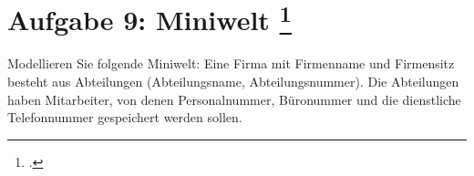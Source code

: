\documentclass{lehramt-informatik-aufgabe}
\begin{document}

\section{Aufgabe 9: Miniwelt
\footcite{db:ab:klausurvorbereitung}}

Modellieren Sie folgende Miniwelt: Eine Firma mit Firmenname und
Firmensitz besteht aus Abteilungen (Abteilungsname, Abteilungsnummer).
Die Abteilungen haben Mitarbeiter, von denen Personalnummer, Büronummer
und die dienstliche Telefonnummer gespeichert werden sollen.
\end{document}
